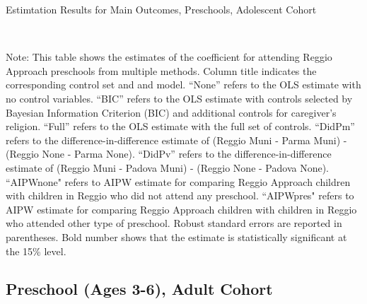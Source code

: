 \begin{table}[H] \caption{Estimtation Results for Main Outcomes, Preschools, Adolescent Cohort} \label{ols-M-adol-reg}
\scalebox{0.9}{}
\vspace{1ex} \\
\footnotesize\raggedright{Note: This table shows the estimates of the coefficient for attending Reggio Approach preschools from multiple methods. Column title indicates the corresponding control set and and model. ``None'' refers to the OLS estimate with no control variables. ``BIC'' refers to the OLS estimate with controls selected by Bayesian Information Criterion (BIC) and additional controls for caregiver's religion. ``Full'' refers to the OLS estimate with the full set of controls. ``DidPm'' refers to the difference-in-difference estimate of (Reggio Muni - Parma Muni) - (Reggio None - Parma None). ``DidPv'' refers to the difference-in-difference estimate of (Reggio Muni - Padova Muni) - (Reggio None - Padova None).  ``AIPWnone" refers to AIPW estimate for comparing Reggio Approach children with children in Reggio who did not attend any preschool. ``AIPWpres" refers to AIPW estimate for comparing Reggio Approach children with children in Reggio who attended other type of preschool. Robust standard errors are reported in parentheses. Bold number shows that the estimate is statistically significant at the 15\% level.}
\end{table}





\subsection{Preschool (Ages 3-6), Adult Cohort}

